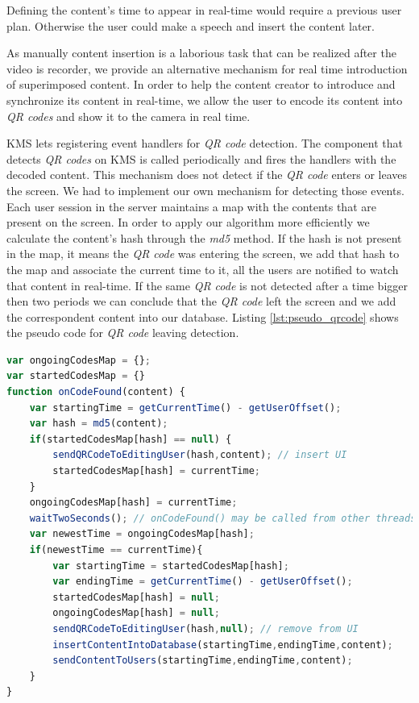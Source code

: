 	Defining the content's time to appear in real-time would require a previous user plan. Otherwise the user could make a speech and insert the content later.


	As manually content insertion is a laborious task that can be realized after the video is recorder, we provide an alternative mechanism for real time introduction of superimposed content.	In order to help the content creator to introduce and synchronize its content in real-time, we allow the user to encode its content into \emph{QR codes} and show it to the camera in real time.

	\ac{KMS} lets registering event handlers for \emph{QR code} detection. The component that detects \emph{QR codes} on \ac{KMS} is called periodically and fires the handlers with the decoded content. This mechanism does not detect if the \emph{QR code} enters or leaves the screen. We had to implement our own mechanism for detecting those events. Each user session in the server maintains a map with the contents that are present on the screen. In order to apply our algorithm more efficiently we calculate the content's hash through the \emph{md5} method. If the hash is not present in the map, it means the \emph{QR code} was entering the screen, we add that hash to the map and associate the current time to it, all the users are notified to watch that content in real-time. If the same \emph{QR code} is not detected after a time bigger then two periods we can conclude that the \emph{QR code} left the screen and we add the correspondent content into our database. Listing \ref{lst:pseudo_qrcode} shows the pseudo code for \emph{QR code} leaving detection.

\begin{minipage}{\linewidth}
\begin{lstlisting}[caption={Pseudo code for QR code leaving detection},label={lst:pseudo_qrcode},language=JavaScript]
var ongoingCodesMap = {};
var startedCodesMap = {}
function onCodeFound(content) {
	var startingTime = getCurrentTime() - getUserOffset();
	var hash = md5(content);
	if(startedCodesMap[hash] == null) {
		sendQRCodeToEditingUser(hash,content); // insert UI
		startedCodesMap[hash] = currentTime;
	}
	ongoingCodesMap[hash] = currentTime;
	waitTwoSeconds(); // onCodeFound() may be called from other threads
	var newestTime = ongoingCodesMap[hash]; 
	if(newestTime == currentTime){
		var startingTime = startedCodesMap[hash];
		var endingTime = getCurrentTime() - getUserOffset();
		startedCodesMap[hash] = null; 
		ongoingCodesMap[hash] = null; 
		sendQRCodeToEditingUser(hash,null); // remove from UI
		insertContentIntoDatabase(startingTime,endingTime,content);
		sendContentToUsers(startingTime,endingTime,content);
	}
}
\end{lstlisting}
\end{minipage}


